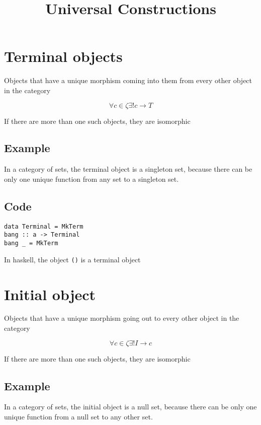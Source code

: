 \documentclass[11pt]{article}
\date{}
\title{Universal Constructions}
\begin{document}
\maketitle

\section{Terminal objects}
\label{sec:orgfe6dc0d}
Objects that have a unique morphism coming into them from every other object in the category

\begin{equation}
\forall c \in \zeta \exists! c \to T
\end{equation}

If there are more than one such objects, they are isomorphic

\subsection{Example}
\label{sec:orgc179554}
In a category of sets, the terminal object is a singleton set, because there can be only one unique function from any set to a singleton set.

\subsection{Code}
\label{sec:org9dd47c1}
\begin{verbatim}
data Terminal = MkTerm
bang :: a -> Terminal
bang _ = MkTerm
\end{verbatim}
In haskell, the object \texttt{()} is a terminal object

\section{Initial object}
\label{sec:org3548e7d}
Objects that have a unique morphism going out to every other object in the category

\begin{equation}
\forall c \in \zeta \exists! I \to c
\end{equation}

If there are more than one such objects, they are isomorphic

\subsection{Example}
\label{sec:org802f106}
In a category of sets, the initial object is a null set, because there can be
only one unique function from a null set to any other set.
\end{document}
